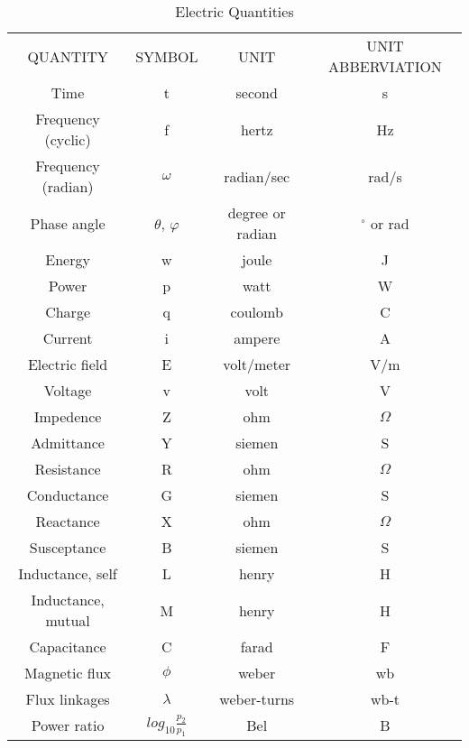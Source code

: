 \begin{table}[h]
	\begin{center}
	\begin{tabular}{c|c|c|c}
		\toprule 
		QUANTITY & SYMBOL & UNIT & UNIT ABBERVIATION 	\\
		Time & t & second & s				\\
		Frequency (cyclic) & f & hertz & Hz \\
		Frequency (radian) & $\omega $& radian/sec & rad/s	\\
		Phase angle &$\theta $, $\varphi $ & degree or radian & $^{\circ}$ or rad \\
		Energy & w & joule & J 	\\
		Power & p & watt & W	\\
		Charge & q  &coulomb & C	\\
		Current & i & ampere  &A	\\
		Electric field & E & volt/meter& V/m	\\
		Voltage & v & volt &V	\\
		Impedence & Z & ohm & $\varOmega$	\\
		Admittance &Y &siemen &S	\\
		Resistance &R &ohm &$\varOmega$	\\
		Conductance& G &siemen &S	\\
		Reactance &X &ohm &$\varOmega$	\\
		Susceptance &B &siemen& S	\\
		Inductance, self &L &henry& H	\\
		Inductance, mutual& M &henry& H	\\
		Capacitance& C& farad &F	\\
		Magnetic flux& $\phi$& weber &wb	\\
		Flux linkages& $\lambda$& weber-turns& wb-t	\\
		Power ratio& $log_{10}\frac{p_2}{p_1}$& Bel &B	\\
		\bottomrule
	\end{tabular}
	\caption{Electric Quantities}
\end{center}
\end{table}

